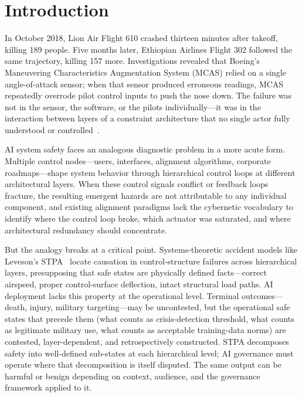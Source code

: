 \section{Introduction}

In October 2018, Lion Air Flight 610 crashed thirteen minutes after takeoff, killing 189 people. Five months later, Ethiopian Airlines Flight 302 followed the same trajectory, killing 157 more. Investigations revealed that Boeing's Maneuvering Characteristics Augmentation System (MCAS) relied on a single angle-of-attack sensor; when that sensor produced erroneous readings, MCAS repeatedly overrode pilot control inputs to push the nose down. The failure was not in the sensor, the software, or the pilots individually---it was in the interaction between layers of a constraint architecture that no single actor fully understood or controlled~\cite{jatr2019737max}.

AI system safety faces an analogous diagnostic problem in a more acute form. Multiple control nodes---users, interfaces, alignment algorithms, corporate roadmaps---shape system behavior through hierarchical control loops at different architectural layers. When these control signals conflict or feedback loops fracture, the resulting emergent hazards are not attributable to any individual component, and existing alignment paradigms lack the cybernetic vocabulary to identify where the control loop broke, which actuator was saturated, and where architectural redundancy should concentrate.

But the analogy breaks at a critical point. Systems-theoretic accident models like Leveson's STPA~\cite{leveson2012engineering, leveson2018stpa} locate causation in control-structure failures across hierarchical layers, presupposing that safe states are physically defined facts---correct airspeed, proper control-surface deflection, intact structural load paths. AI deployment lacks this property at the operational level. Terminal outcomes---death, injury, military targeting---may be uncontested, but the operational safe states that precede them (what counts as crisis-detection threshold, what counts as legitimate military use, what counts as acceptable training-data norms) are contested, layer-dependent, and retrospectively constructed. STPA decomposes safety into well-defined sub-states at each hierarchical level; AI governance must operate where that decomposition is itself disputed. The same output can be harmful or benign depending on context, audience, and the governance framework applied to it.

